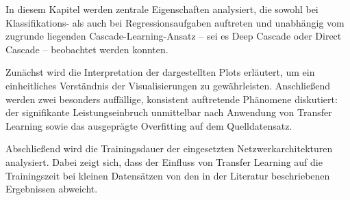 In diesem Kapitel werden zentrale Eigenschaften analysiert, die sowohl bei Klassifikations- als auch bei Regressionsaufgaben auftreten und 
unabhängig vom zugrunde liegenden Cascade-Learning-Ansatz – sei es Deep Cascade oder Direct Cascade – beobachtet werden konnten.

Zunächst wird die Interpretation der dargestellten Plots erläutert, um ein einheitliches Verständnis der Visualisierungen zu gewährleisten. 
Anschließend werden zwei besonders auffällige, konsistent auftretende Phänomene diskutiert: der signifikante Leistungseinbruch unmittelbar 
nach Anwendung von Transfer Learning sowie das ausgeprägte Overfitting auf dem Quelldatensatz.

Abschließend wird die Trainingsdauer der eingesetzten Netzwerkarchitekturen analysiert. Dabei zeigt sich, dass der Einfluss von Transfer 
Learning auf die Trainingszeit bei kleinen Datensätzen von den in der Literatur beschriebenen Ergebnissen abweicht.
